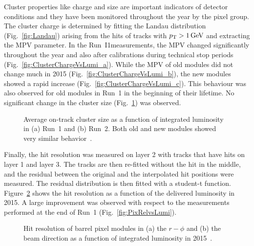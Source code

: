 Cluster properties like charge and size are important indicators of detector conditions and they have been monitored throughout the year by the pixel group.
The cluster charge is determined by fitting the Landau distribution (Fig.~\ref{fig:Landau}) arising from the hits of tracks with $p_{\mathrm{T}} > 1\,\text{Ge\hspace{-.08em}V}$ and extracting the MPV parameter.
In the Run~I1measurements, the MPV changed significantly throughout the year and also after calibrations during technical stop periods (Fig.~\ref{fig:ClusterChargeVsLumi_a}).
While the MPV of old modules did not change much in 2015 (Fig.~\ref{fig:ClusterChargeVsLumi_b}), the new modules showed a rapid increase (Fig.~\ref{fig:ClusterChargeVsLumi_c}).
This behaviour was also observed for old modules in Run~1 in the beginning of their lifetime. No significant change in the cluster size (Fig.~\ref{fig:ClusterSizeVsLumi}) was observed.

\begin{figure}[!htb]
 \begin{center}
 \end{center}
 \caption{Average on-track cluster size as a function of integrated luminosity in (a) Run~1 and (b) Run~2. Both old and new modules showed very similar behavior~\cite{PixelOffline}.}
 \label{fig:ClusterSizeVsLumi}
\end{figure}

Finally, the hit resolution was measured on layer 2 with tracks that have hits on layer 1 and layer 3.
The tracks are then re-fitted without the hit in the middle, and the residual between the original and the interpolated hit positions were measured.
The residual distribution is then fitted with a student-t function. Figure~\ref{fig:RelVsLumi2015} shows the hit resolution as a function of the delivered luminosity in 2015.
A large improvement was observed with respect to the measurements performed at the end of Run~1 (Fig.~\ref{fig:PixRelvsLumi}).

\begin{figure}[!htb]
 \begin{center}
 \end{center}
 \caption{Hit resolution of barrel pixel modules in (a) the $r-\phi$ and (b) the beam direction as a function of integrated luminosity in 2015~\cite{PixelOffline}.}
 \label{fig:RelVsLumi2015}
\end{figure}
